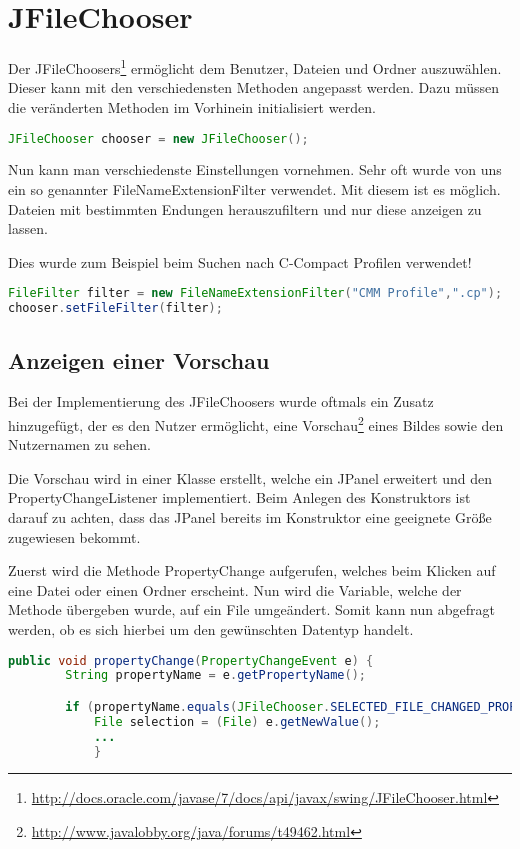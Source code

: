 \section{JFileChooser}
\label{sec:JFileChooser}

Der JFileChoosers\footnote{\url{http://docs.oracle.com/javase/7/docs/api/javax/swing/JFileChooser.html}} ermöglicht dem Benutzer, Dateien und Ordner auszuwählen. Dieser kann mit den verschiedensten Methoden angepasst werden. Dazu müssen die veränderten Methoden im Vorhinein initialisiert werden.

\begin{lstlisting}[language=JAVA]
JFileChooser chooser = new JFileChooser();
\end{lstlisting}
    
Nun kann man verschiedenste Einstellungen vornehmen. Sehr oft wurde von uns ein so genannter FileNameExtensionFilter verwendet. Mit diesem ist es möglich. Dateien mit bestimmten Endungen herauszufiltern und nur diese anzeigen zu lassen.

Dies wurde zum Beispiel beim Suchen nach C-Compact Profilen verwendet!
\begin{lstlisting}[language=JAVA]
FileFilter filter = new FileNameExtensionFilter("CMM Profile",".cp");
chooser.setFileFilter(filter);
\end{lstlisting}



\subsection{Anzeigen einer Vorschau}
Bei der Implementierung des JFileChoosers wurde oftmals ein Zusatz hinzugefügt, der es den Nutzer ermöglicht, eine Vorschau\footnote{\url{http://www.javalobby.org/java/forums/t49462.html}} eines Bildes sowie den Nutzernamen zu sehen.

Die Vorschau wird in einer Klasse erstellt, welche ein JPanel erweitert und den PropertyChangeListener implementiert. Beim Anlegen des Konstruktors ist darauf zu achten, dass das JPanel bereits im Konstruktor eine geeignete Größe zugewiesen bekommt.

Zuerst wird die Methode PropertyChange aufgerufen, welches beim Klicken auf eine Datei oder einen Ordner erscheint. Nun wird die Variable, welche der Methode übergeben wurde, auf ein File umgeändert. Somit kann nun abgefragt werden, ob es sich hierbei um den gewünschten Datentyp handelt. 
\begin{lstlisting}[language=JAVA]
	public void propertyChange(PropertyChangeEvent e) {
		String propertyName = e.getPropertyName();

		if (propertyName.equals(JFileChooser.SELECTED_FILE_CHANGED_PROPERTY)) {
			File selection = (File) e.getNewValue();
			...
			}
\end{lstlisting}

